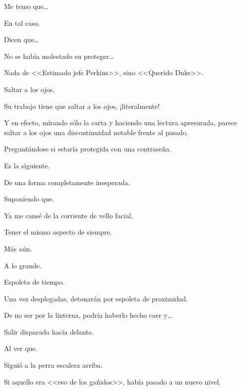 \sk
Me temo que\ldots{} 

\sk
En tal caso. 

\sk
Dicen que\ldots{} 

\sk
No se había molestado en proteger\ldots{} 

\sk
Nada de <<Estimado jefe Perkins>>, sino <<Querido Duke>>.\nb{}

\sk
Saltar a los ojos. 

\sk
Su trabajo tiene que saltar a los ojos, ¡literalmente! 

\sk
Y en efecto, mirando sólo la carta y haciendo una lectura apresurada, parece saltar a los ojos una discontinuidad notable frente al pasado. 

\sk
Preguntándose si estaría protegida con una contraseña.\nb{}

\sk
Es la siguiente. 

\sk
De una forma completamente inesperada. \nb{}

\sk
Suponiendo que. 

\sk
Ya me cansé de la corriente de vello facial. 

\sk
Tener el mismo aspecto de siempre. 

\sk
Más aún. 

\sk
A lo grande. 

\sk
Espoleta de tiempo. 

\sk
Una vez desplegadas, detonarán por espoleta de proximidad. 

\sk
De no ser por la linterna, podría haberlo hecho caer y\ldots{} 

\sk
Salir disparada hacia delante. 

\sk
Al ver que. 

\sk
Siguió a la perra escalera arriba. 

\sk
Si aquello era <<eso de los gañidos>>, había pasado a un nuevo nivel. 

